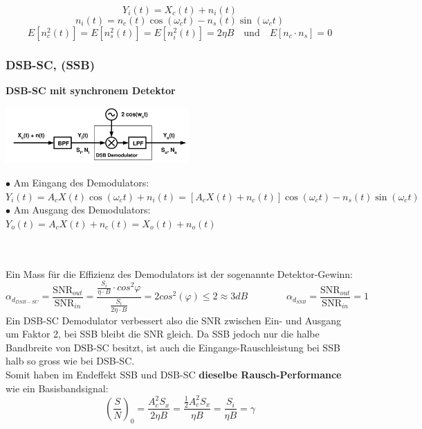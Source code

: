 	$$ Y_i(t) = X_c(t) + n_i(t)$$
	$$n_i(t) = n_c(t) \cos(\omega_c t) - n_s(t) \sin(\omega_c t) $$
	$$ E[n_c^2(t)] = E[n_s^2(t)] = E[n_i^2(t)] = 2 \eta B \quad \text{und} \quad E[n_c\cdot n_s] = 0$$



\subsubsection{DSB-SC, (SSB) }
\textbf{DSB-SC mit synchronem Detektor}\\
\begin{minipage}{7.5cm}
	\includegraphics[width = 7cm]{./bilder/08_Sync_Detektor_DSB}
\end{minipage}
\begin{minipage}{11cm}
  $\bullet$ Am Eingang des Demodulators:\\ 
  \hspace*{0.3cm}$Y_i(t) = A_c X(t) \cos (\omega_c t) + n_i(t) = [A_c X(t) + n_c(t)]\cos(\omega_c t) - n_s(t)\sin(\omega_c t)$\\
  $\bullet$ Am Ausgang des Demodulators:\\ 
  \hspace*{0.3cm} $Y_o(t) = A_c X(t) + n_c(t) = X_o(t) + n_o(t)$
\end{minipage}\\ \\
Ein Mass für die Effizienz des Demodulators ist der sogenannte Detektor-Gewinn: \\
$$ \alpha_{d_{DSB-SC}} = \dfrac{\text{SNR}_{out}}{\text{SNR}_{in}} = \frac{\frac{S_i}{\eta \cdot B} \cdot cos^2\varphi}{\frac{S_i}{2\eta \cdot B}} = 2cos^2(\varphi) \leq 2 \approx 3 dB
\qquad \qquad
 \alpha_{d_{SSB}} = \dfrac{\text{SNR}_{out}}{\text{SNR}_{in}} = 1
$$
Ein DSB-SC Demodulator verbessert also die SNR zwischen Ein- und Ausgang um Faktor 2, bei SSB
bleibt die SNR gleich. Da SSB jedoch nur die halbe Bandbreite von DSB-SC besitzt, ist auch die
Eingangs-Rauschleistung bei SSB halb so gross wie bei DSB-SC. \\
Somit haben im Endeffekt SSB und DSB-SC \textbf{dieselbe Rausch-Performance} wie ein Basisbandsignal: 
	$$ \left(\dfrac{S}{N}\right)_0 =
	\dfrac{A_c^2 S_x}{2 \eta B} = \dfrac{\frac12 A_c^2 S_x}{\eta B} = \dfrac{S_i}{\eta B} = \gamma $$


